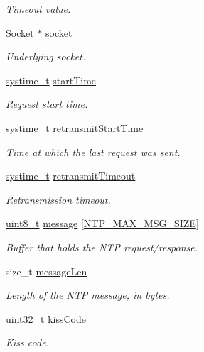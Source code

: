 \begin{DoxyCompactItemize}
\begin{DoxyCompactList}\small\item\em Timeout value. \end{DoxyCompactList}\item 
\hyperlink{socket_8h_aa85acfb0fa336ef495e6ba87fb88fc48}{Socket} $\ast$ \hyperlink{structSntpClientContext_aa81b4c38e5803188b89f1d13473235b0}{socket}
\begin{DoxyCompactList}\small\item\em Underlying socket. \end{DoxyCompactList}\item 
\hyperlink{compiler__port_8h_ae3e32a98d431a02106616da3071832dd}{systime\+\_\+t} \hyperlink{structSntpClientContext_ae6aa657a6ac2d5a76fc8e026066fa77c}{start\+Time}
\begin{DoxyCompactList}\small\item\em Request start time. \end{DoxyCompactList}\item 
\hyperlink{compiler__port_8h_ae3e32a98d431a02106616da3071832dd}{systime\+\_\+t} \hyperlink{structSntpClientContext_a15b1f25abf336af057af833edb2ef979}{retransmit\+Start\+Time}
\begin{DoxyCompactList}\small\item\em Time at which the last request was sent. \end{DoxyCompactList}\item 
\hyperlink{compiler__port_8h_ae3e32a98d431a02106616da3071832dd}{systime\+\_\+t} \hyperlink{structSntpClientContext_a09a8ebb9934b44dfbcca76edab7ceb76}{retransmit\+Timeout}
\begin{DoxyCompactList}\small\item\em Retransmission timeout. \end{DoxyCompactList}\item 
\hyperlink{stdint_8h_aba7bc1797add20fe3efdf37ced1182c5}{uint8\+\_\+t} \hyperlink{structSntpClientContext_a01d165c31bb0453f58841511183b37cc}{message} \mbox{[}\hyperlink{ntp__common_8h_a5820e5e5d218c5509145b98842d55c70}{N\+T\+P\+\_\+\+M\+A\+X\+\_\+\+M\+S\+G\+\_\+\+S\+I\+ZE}\mbox{]}
\begin{DoxyCompactList}\small\item\em Buffer that holds the N\+TP request/response. \end{DoxyCompactList}\item 
size\+\_\+t \hyperlink{structSntpClientContext_a488494d0644f9278a86389cb442aa49e}{message\+Len}
\begin{DoxyCompactList}\small\item\em Length of the N\+TP message, in bytes. \end{DoxyCompactList}\item 
\hyperlink{stdint_8h_a435d1572bf3f880d55459d9805097f62}{uint32\+\_\+t} \hyperlink{structSntpClientContext_af69b89fcaec3ccf3949de106a1768c77}{kiss\+Code}
\begin{DoxyCompactList}\small\item\em Kiss code. \end{DoxyCompactList}\end{DoxyCompactItemize}


